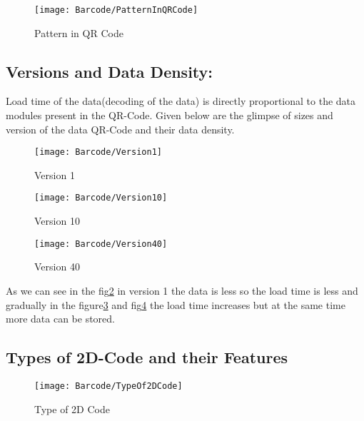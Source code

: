 \begin{figure}
	\begin{flushright}
		\texttt{[image: Barcode/PatternInQRCode]}
		\caption{Pattern in QR Code}\label{Pattern in QR Code}
	\end{flushright}
\end{figure}

\subsection{Versions and Data Density:}

Load time of the data(decoding of the data) is directly proportional to the data modules present in the QR-Code. Given below are the glimpse of sizes and version of the data QR-Code and their data density.

\begin{figure}
	\begin{center}
		\texttt{[image: Barcode/Version1]}
		\caption{Version 1}\label{Version 1}
	\end{center}
\end{figure}


\begin{figure}
	\begin{center}
		\texttt{[image: Barcode/Version10]}
		\caption{Version 10}\label{Version 10}
	\end{center}
\end{figure}


\begin{figure}
	\begin{center}
		\texttt{[image: Barcode/Version40]}
		\caption{Version 40}\label{Version 40}
	\end{center}
\end{figure}

As we can see in the fig\ref{Version 1} in version 1 the data is less so the load time is less and gradually in the figure\ref{Version 10} and fig\ref{Version 40} the load time increases but at the same time more data can be stored.


\subsection{Types of 2D-Code and their Features}

\begin{figure}
	\begin{center}
		\texttt{[image: Barcode/TypeOf2DCode]}
		\caption{Type of 2D Code}\label{Type of 2D Code}
	\end{center}
\end{figure}

